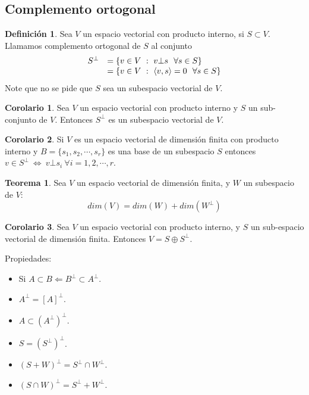 \documentclass[10pt]{article}
\theoremstyle{definition}
\newtheorem{definition}{Definición}[section]
\newtheorem{theorem}{Teorema}[section]
\newtheorem{corollary}{Corolario}[theorem]
\begin{document}
\subsection{Complemento ortogonal}
\begin{definition}
	Sea $V$ un espacio vectorial con producto interno, si $S\subset V$. Llamamos complemento ortogonal de $S$ al conjunto $$\begin{array}{ c l }
			S^{\bot } & =\{v\in V\ :\ v\bot s\ \ \forall s\in S\}               \\
			          & =\{v\in V\ :\ \langle v,s\rangle =0\ \ \forall s\in S\}
		\end{array}$$
	Note que no se pide que $S$ sea un subespacio vectorial de $V$.
\end{definition}
\begin{corollary}
	Sea $V$ un espacio vectorial con producto interno y $S$ un sub-conjunto de $V$. Entonces $S^\bot$ es un subespacio vectorial de $V$.
\end{corollary}
\begin{corollary}
	Si $V$ es un espacio vectorial de dimensión finita con producto interno y $B=\{s_1,s_2,\cdots,s_r\}$ es una base de un subespacio $S$ entonces $v\in S^\bot\ \Leftrightarrow\ v\bot s_i\ \forall i=1,2,\cdots,r$.
\end{corollary}
\begin{theorem}
	Sea $V$ un espacio vectorial de dimensión finita, y $W$ un subespacio de $V$:$$dim(V)=dim(W)+dim(W^\bot)$$
\end{theorem}
\begin{corollary}
	Sea $V$ un espacio vectorial con producto interno, y $S$ un sub-espacio vectorial de dimensión finita. Entonces $V=S\oplus S^\bot$.
\end{corollary}
Propiedades:
\begin{itemize}
	\item Si $A\subset B \Leftarrow B^\bot \subset A^\bot$.
	\item $A^\bot = [A]^\bot$.
	\item $A\subset (A^\bot)^\bot$.
	\item $S=(S^\bot)^\bot$.
	\item $(S+W)^\bot =S^\bot \cap W^\bot$.
	\item $(S\cap W)^\bot = S^\bot + W^\bot$.
\end{itemize}\newpage
\end{document}

